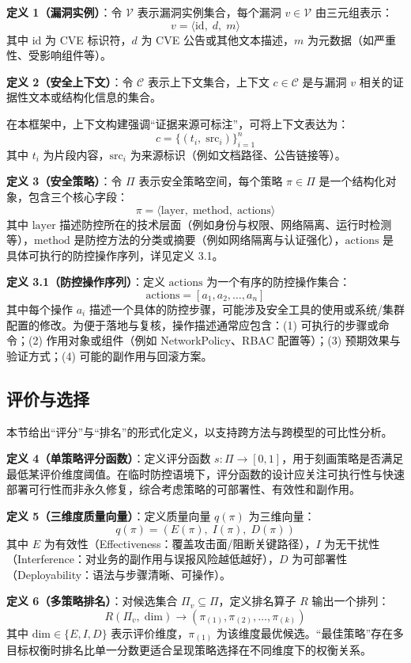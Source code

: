	\textbf{定义 1（漏洞实例）}：令 $\mathcal{V}$ 表示漏洞实例集合，每个漏洞 $v \in \mathcal{V}$ 由三元组表示：
\[
v = \langle \text{id},\; d,\; m \rangle
\]
其中 $\text{id}$ 为 CVE 标识符，$d$ 为 CVE 公告或其他文本描述，$m$ 为元数据（如严重性、受影响组件等）。

	\textbf{定义 2（安全上下文）}：令 $\mathcal{C}$ 表示上下文集合，上下文 $c \in \mathcal{C}$ 是与漏洞 $v$ 相关的证据性文本或结构化信息的集合。

在本框架中，上下文构建强调“证据来源可标注”，可将上下文表达为：
\[
c = \{(t_i,\; \text{src}_i)\}_{i=1}^{n}
\]
其中 $t_i$ 为片段内容，$\text{src}_i$ 为来源标识（例如文档路径、公告链接等）。

	\textbf{定义 3（安全策略）}：令 $\Pi$ 表示安全策略空间，每个策略 $\pi \in \Pi$ 是一个结构化对象，包含三个核心字段：
\[
\pi = \langle \text{layer},\; \text{method},\; \text{actions} \rangle
\]
其中 $\text{layer}$ 描述防控所在的技术层面（例如身份与权限、网络隔离、运行时检测等），$\text{method}$ 是防控方法的分类或摘要（例如网络隔离与认证强化），$\text{actions}$ 是具体可执行的防控操作序列，详见定义 3.1。

	\textbf{定义 3.1（防控操作序列）}：定义 $\text{actions}$ 为一个有序的防控操作集合：
\[
    \mathrm{actions} = [a_1, a_2, \ldots, a_n]
\]
其中每个操作 $a_i$ 描述一个具体的防控步骤，可能涉及安全工具的使用或系统/集群配置的修改。为便于落地与复核，操作描述通常应包含：(1) 可执行的步骤或命令；(2) 作用对象或组件（例如 NetworkPolicy、RBAC 配置等）；(3) 预期效果与验证方式；(4) 可能的副作用与回滚方案。

\subsection{评价与选择}

本节给出“评分”与“排名”的形式化定义，以支持跨方法与跨模型的可比性分析。

	\textbf{定义 4（单策略评分函数）}：定义评分函数 $s: \Pi \to [0,1]$，用于刻画策略是否满足最低某评价维度阈值。在临时防控语境下，评分函数的设计应关注可执行性与快速部署可行性而非永久修复，综合考虑策略的可部署性、有效性和副作用。

	\textbf{定义 5（三维度质量向量）}：定义质量向量 $q(\pi)$ 为三维向量：
\[
q(\pi) = (E(\pi),\; I(\pi),\; D(\pi))
\]
其中 $E$ 为有效性（Effectiveness：覆盖攻击面/阻断关键路径），$I$ 为无干扰性（Interference：对业务的副作用与误报风险越低越好），$D$ 为可部署性（Deployability：语法与步骤清晰、可操作）。

	\textbf{定义 6（多策略排名）}：对候选集合 $\Pi_v \subseteq \Pi$，定义排名算子 $R$ 输出一个排列：
\[
R(\Pi_v,\; \text{dim}) \rightarrow (\pi_{(1)},\pi_{(2)},\ldots,\pi_{(k)})
\]
其中 $\text{dim} \in \{E,I,D\}$ 表示评价维度，$\pi_{(1)}$ 为该维度最优候选。“最佳策略”存在多目标权衡时排名比单一分数更适合呈现策略选择在不同维度下的权衡关系。

